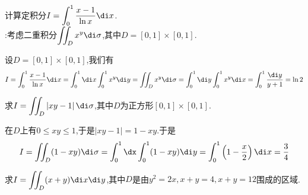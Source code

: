 \documentclass{ctexart}
\begin{document}
\pagestyle{empty}
\begin{center}
    \large{}
\end{center}
\begin{problem}[L.2.1]
    计算定积分$I=\displaystyle\int_0^1\dfrac{x-1}{\ln x}\di x$.\\
    :考虑二重积分$\displaystyle\iint_Dx^y\di\sigma$,其中$D=[0,1]\times[0,1]$.
\end{problem}
\begin{solution}
    设$D=[0,1]\times[0,1]$,我们有
    \[I = \int_0^1\dfrac{x-1}{\ln x}\di x = \int_0^1\di x\int_0^1x^y\di y
    = \iint_Dx^y\di\sigma = \int_0^1\di y\int_0^1x^y\di x
    = \int_0^1\dfrac{\di y}{y+1} = \ln 2\]
\end{solution}
\begin{problem}[L.2.2]
    求$\displaystyle I=\iint_D\left|xy-1\right|\di\sigma$,其中$D$为正方形$[0,1]\times[0,1]$.
\end{problem}
\begin{solution}
    在$D$上有$0\leqslant xy\leqslant 1$,于是$|xy-1|=1-xy$.于是
    \[I=\iint_D(1-xy)\di\sigma=\int_0^1\dx\int_0^1(1-xy)\di y=\int_0^1\left(1-\dfrac x2\right)\di x=\dfrac34\]
\end{solution}
\begin{problem}[L.2.3]
    求$\displaystyle I=\iint_{D}(x+y)\di x\di y$,其中$D$是由$y^2=2x,x+y=4,x+y=12$围成的区域.
\end{problem}
\end{document}
